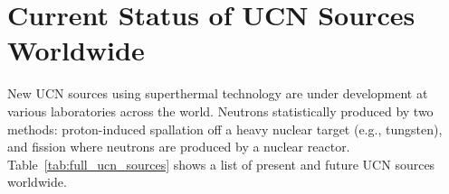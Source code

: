 

\section{Current Status of UCN Sources Worldwide}
New UCN sources using superthermal technology are under development at
various laboratories across the world. Neutrons statistically produced
by two methods: proton-induced spallation off a heavy nuclear target
(e.g., tungsten), and fission where neutrons are produced by a nuclear
reactor. Table~\ref{tab:full_ucn_sources} shows a list of present and
future UCN sources worldwide.



